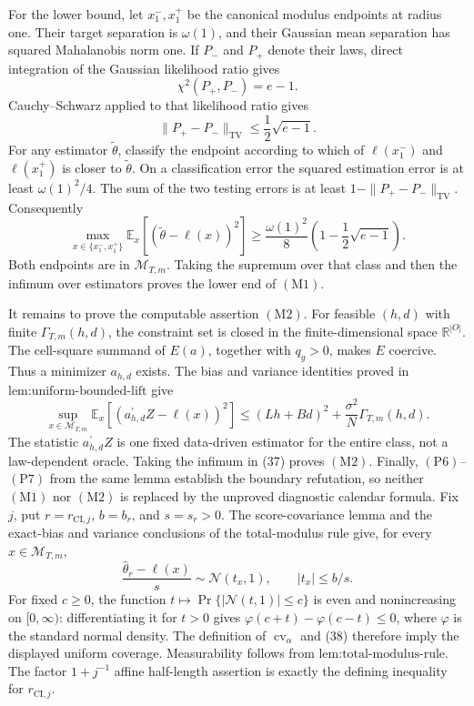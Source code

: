 For the lower bound, let \(x^-_1,x^+_1\) be the canonical modulus endpoints at radius one.  Their target separation is \(\omega(1)\), and their Gaussian mean separation has squared Mahalanobis norm one.  If \(P_-\) and \(P_+\) denote their laws, direct integration of the Gaussian likelihood ratio gives
\[
 \chi^2(P_+,P_-)=e-1.
\]
Cauchy--Schwarz applied to that likelihood ratio gives
\[
 \|P_+-P_-\|_{\mathrm{TV}}\le\frac12\sqrt{e-1}.                \tag{35}
\]
For any estimator \(\widetilde\theta\), classify the endpoint according to which of \(\ell(x^-_1)\) and \(\ell(x^+_1)\) is closer to \(\widetilde\theta\).  On a classification error the squared estimation error is at least \(\omega(1)^2/4\).  The sum of the two testing errors is at least \(1-\|P_+-P_-\|_{\mathrm{TV}}\).  Consequently
\[
 \max_{x\in\{x^-_1,x^+_1\}}
 \mathbb E_x[(\widetilde\theta-\ell(x))^2]
 \ge\frac{\omega(1)^2}{8}
 \left(1-\frac12\sqrt{e-1}\right).                            \tag{36}
\]
Both endpoints are in \(\mathcal M_{T,m}\).  Taking the supremum over that class and then the infimum over estimators proves the lower end of \((\mathrm{M1})\).

It remains to prove the computable assertion \((\mathrm{M2})\).  For feasible \((h,d)\) with finite \(\Gamma_{T,m}(h,d)\), the constraint set is closed in the finite-dimensional space \(\mathbb R^{|O|}\).  The cell-square summand of \(E(a)\), together with \(q_g>0\), makes \(E\) coercive.  Thus a minimizer \(a_{h,d}\) exists.  The bias and variance identities proved in \(\text{lem:uniform-bounded-lift}\) give
\[
 \sup_{x\in\mathcal M_{T,m}}
 \mathbb E_x[(a_{h,d}^{\prime}Z-\ell(x))^2]
 \le(Lh+Bd)^2+\frac{\sigma^2}{N}\Gamma_{T,m}(h,d).              \tag{37}
\]
The statistic \(a_{h,d}^{\prime}Z\) is one fixed data-driven estimator for the entire class, not a law-dependent oracle.  Taking the infimum in (37) proves \((\mathrm{M2})\).  Finally, \((\mathrm{P6})\)--\((\mathrm{P7})\) from the same lemma establish the boundary refutation, so neither \((\mathrm{M1})\) nor \((\mathrm{M2})\) is replaced by the unproved diagnostic calendar formula.
Fix \(j\), put \(r=r_{\mathrm{CI},j}\), \(b=b_r\), and \(s=s_r>0\).  The score-covariance lemma and the exact-bias and variance conclusions of the total-modulus rule give, for every \(x\in\mathcal M_{T,m}\),
\[
 \frac{\widehat\theta_r-\ell(x)}s\sim\mathcal N(t_x,1),
 \qquad |t_x|\le b/s.                                           \tag{38}
\]
For fixed \(c\ge0\), the function \(t\mapsto\Pr\{|\mathcal N(t,1)|\le c\}\) is even and nonincreasing on \([0,\infty)\): differentiating it for \(t>0\) gives \(\varphi(c+t)-\varphi(c-t)\le0\), where \(\varphi\) is the standard normal density.  The definition of \(\operatorname{cv}_\alpha\) and (38) therefore imply the displayed uniform coverage.  Measurability follows from \(\text{lem:total-modulus-rule}\).  The factor \(1+j^{-1}\) affine half-length assertion is exactly the defining inequality for \(r_{\mathrm{CI},j}\).

